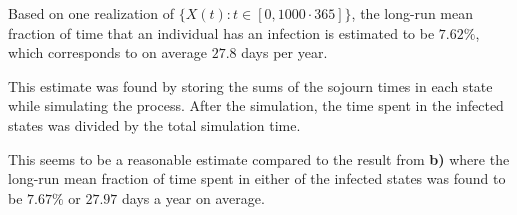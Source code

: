 Based on one realization of $\{X(t): t \in [0,1000\cdot365]\}$, the long-run mean fraction of time that an individual has an infection is estimated to be $7.62\%$, which corresponds to on average $27.8$ days per year. 

This estimate was found by storing the sums of the sojourn times in each state while simulating the process. After the simulation, the time spent in the infected states was divided by the total simulation time. 

This seems to be a reasonable estimate compared to the result from \textbf{b)} where the long-run mean fraction of time spent in either of the infected states was found to be $7.67\%$ or $27.97$ days a year on average.

